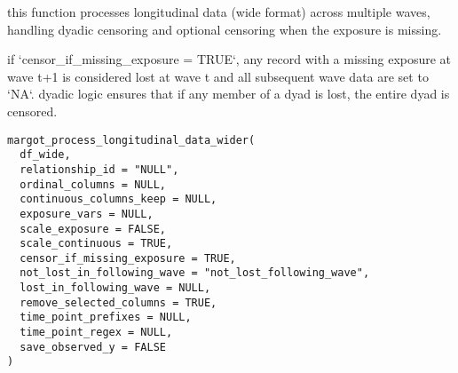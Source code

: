 \documentclass[a4paper]{book}
\begin{document}
%
\begin{Description}
this function processes longitudinal data (wide format) across multiple waves,
handling dyadic censoring and optional censoring when the exposure is missing.

if `censor\_if\_missing\_exposure = TRUE`, any record with a missing exposure at wave t+1
is considered lost at wave t and all subsequent wave data are set to `NA`. dyadic logic
ensures that if any member of a dyad is lost, the entire dyad is censored.
\end{Description}
%
\begin{Usage}
\begin{verbatim}
margot_process_longitudinal_data_wider(
  df_wide,
  relationship_id = "NULL",
  ordinal_columns = NULL,
  continuous_columns_keep = NULL,
  exposure_vars = NULL,
  scale_exposure = FALSE,
  scale_continuous = TRUE,
  censor_if_missing_exposure = TRUE,
  not_lost_in_following_wave = "not_lost_following_wave",
  lost_in_following_wave = NULL,
  remove_selected_columns = TRUE,
  time_point_prefixes = NULL,
  time_point_regex = NULL,
  save_observed_y = FALSE
)
\end{verbatim}
\end{Usage}
%
\end{document}
